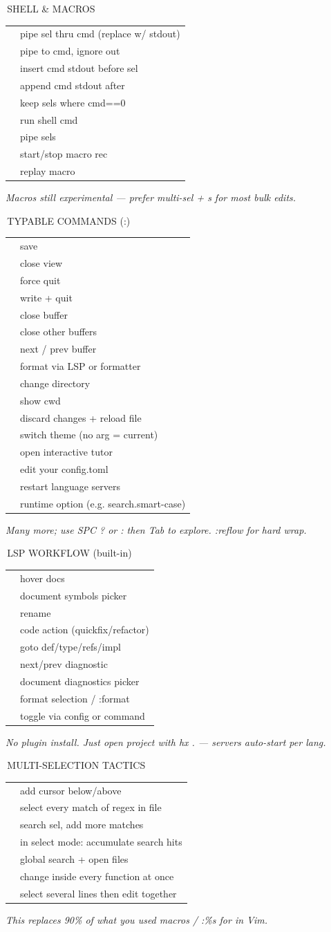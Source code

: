 \documentclass[9pt,a4paper,landscape]{extarticle}
\makeatletter
\newcommand{\kbd}[1]{{\ttfamily\bfseries\footnotesize\color{keyclr}#1}}
\newcommand{\sect}[1]{%
  \vspace{0pt}%
  {\setlength{\fboxsep}{0.5pt}%
   \noindent\colorbox{hdrbg}{\parbox{\dimexpr\columnwidth-1pt\relax}{%
     \color{hdrfg}\bfseries\sffamily\footnotesize\strut\,#1}}}%
  \par\vspace{0pt}}
\newlength{\kdsep}\setlength{\kdsep}{0pt}
\newcommand{\kd}[2]{\kbd{#1} & #2 \\[\kdsep]}
\newenvironment{kt}{%
  \setlength{\tabcolsep}{0pt}%
  \begin{tabular}{@{}>{\footnotesize\raggedright\arraybackslash}p{17mm}@{\hspace{1.5pt}}>{\footnotesize\color{bodyclr}\raggedright\arraybackslash}p{\dimexpr\columnwidth-17mm-1.5pt\relax}@{}}%
}{%
  \end{tabular}\par}
\newcommand{\snote}[1]{{\scriptsize\color{noteclr}\textit{#1}}\vspace{0pt}\par}
\makeatother
\begin{document}
\begin{multicols}{5}
\sect{SHELL \& MACROS}
\begin{kt}
\kd{|}{pipe sel thru cmd (replace w/ stdout)}
\kd{Alt-|}{pipe to cmd, ignore out}
\kd{!}{insert cmd stdout before sel}
\kd{Alt-!}{append cmd stdout after}
\kd{\$}{keep sels where cmd==0}
\kd{:sh / :!}{run shell cmd}
\kd{:pipe / :| }{pipe sels}
\kd{Q}{start/stop macro rec}
\kd{q}{replay macro}
\end{kt}
\snote{Macros still experimental --- prefer multi-sel + s for most bulk edits.}

\sect{TYPABLE COMMANDS (:)}
\begin{kt}
\kd{:w / :write}{save}
\kd{:q / :quit}{close view}
\kd{:q!}{force quit}
\kd{:wq / :x}{write + quit}
\kd{:bc / :bclose}{close buffer}
\kd{:bco}{close other buffers}
\kd{:bn / :bp}{next / prev buffer}
\kd{:format / :fmt}{format via LSP or formatter}
\kd{:cd}{change directory}
\kd{:pwd}{show cwd}
\kd{:reload}{discard changes + reload file}
\kd{:theme}{switch theme (no arg = current)}
\kd{:tutor}{open interactive tutor}
\kd{:config-open}{edit your config.toml}
\kd{:lsp-restart}{restart language servers}
\kd{:set / :toggle}{runtime option (e.g. search.smart-case)}
\end{kt}
\snote{Many more; use SPC ? or : then Tab to explore. :reflow for hard wrap.}

\sect{LSP WORKFLOW (built-in)}
\begin{kt}
\kd{SPC k}{hover docs}
\kd{SPC s}{document symbols picker}
\kd{SPC r}{rename}
\kd{SPC a}{code action (quickfix/refactor)}
\kd{gd / gy / gr / gi}{goto def/type/refs/impl}
\kd{]d / [d}{next/prev diagnostic}
\kd{SPC d}{document diagnostics picker}
\kd{=}{format selection / :format}
\kd{inlay hints}{toggle via config or command}
\end{kt}
\snote{No plugin install. Just open project with hx . --- servers auto-start per lang.}

\sect{MULTI-SELECTION TACTICS}
\begin{kt}
\kd{C/Alt-C}{add cursor below/above}
\kd{\% s pat Enter}{select every match of regex in file}
\kd{* or Alt-* then n}{search sel, add more matches}
\kd{v n / v N}{in select mode: accumulate search hits}
\kd{SPC / then pick}{global search + open files}
\kd{ma f then c}{change inside every function at once}
\kd{x C x C}{select several lines then edit together}
\end{kt}
\snote{This replaces 90\% of what you used macros / :\%s for in Vim.}


\end{multicols}
\end{document}
